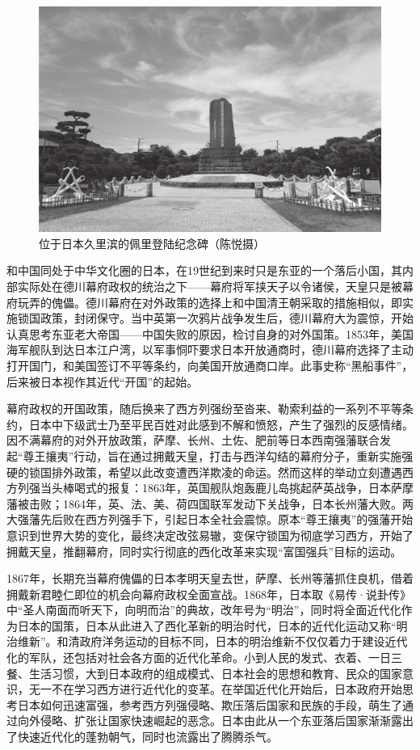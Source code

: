 \documentclass[12pt,UTF8]{ctexbook}
\begin{document}
\begin{figure}[htbp]
	\centering
	\includegraphics[width=0.7\linewidth]{2}
	\caption{位于日本久里滨的佩里登陆纪念碑（陈悦摄）}
	\label{fig:1}
\end{figure}

和中国同处于中华文化圈的日本，在19世纪到来时只是东亚的一个落后小国，其内部实际处在德川幕府政权的统治之下——幕府将军挟天子以令诸侯，天皇只是被幕府玩弄的傀儡。德川幕府在对外政策的选择上和中国清王朝采取的措施相似，即实施锁国政策，封闭保守。当中英第一次鸦片战争发生后，德川幕府大为震惊，开始认真思考东亚老大帝国——中国失败的原因，检讨自身的对外国策。1853年，美国海军舰队到达日本江户湾，以军事恫吓要求日本开放通商时，德川幕府选择了主动打开国门，和美国签订不平等条约，向美国开放通商口岸。此事史称“黑船事件”，后来被日本视作其近代“开国”的起始。

幕府政权的开国政策，随后换来了西方列强纷至沓来、勒索利益的一系列不平等条约，日本中下级武士乃至平民百姓对此感到不解和愤怒，产生了强烈的反感情绪。因不满幕府的对外开放政策，萨摩、长州、土佐、肥前等日本西南强藩联合发起“尊王攘夷”行动，旨在通过拥戴天皇，打击与西洋勾结的幕府分子，重新实施强硬的锁国排外政策，希望以此改变遭西洋欺凌的命运。然而这样的举动立刻遭遇西方列强当头棒喝式的报复：1863年，英国舰队炮轰鹿儿岛挑起萨英战争，日本萨摩藩被击败；1864年，英、法、美、荷四国联军发动下关战争，日本长州藩大败。两大强藩先后败在西方列强手下，引起日本全社会震惊。原本“尊王攘夷”的强藩开始意识到世界大势的变化，最终决定改弦易辙，变保守锁国为彻底学习西方，开始了拥戴天皇，推翻幕府，同时实行彻底的西化改革来实现“富国强兵”目标的运动。

1867年，长期充当幕府傀儡的日本孝明天皇去世，萨摩、长州等藩抓住良机，借着拥戴新君睦仁即位的机会向幕府政权全面宣战。1868年，日本取《易传·说卦传》中“圣人南面而听天下，向明而治”的典故，改年号为“明治”，同时将全面近代化作为日本的国策，日本从此进入了西化革新的明治时代，日本的近代化运动又称“明治维新”。和清政府洋务运动的目标不同，日本的明治维新不仅仅着力于建设近代化的军队，还包括对社会各方面的近代化革命。小到人民的发式、衣着、一日三餐、生活习惯，大到日本政府的组成模式、日本社会的思想和教育、民众的国家意识，无一不在学习西方进行近代化的变革。在举国近代化开始后，日本政府开始思考日本如何迅速富强，参考西方列强侵略、欺压落后国家和民族的手段，萌生了通过向外侵略、扩张让国家快速崛起的恶念。日本由此从一个东亚落后国家渐渐露出了快速近代化的蓬勃朝气，同时也流露出了腾腾杀气。
\end{document}
